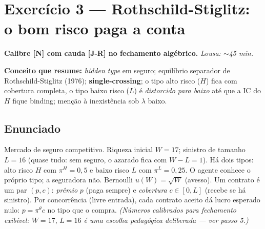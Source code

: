 \documentclass[11pt,a4paper]{article}
\newcommand{\calY}{\textbf{\textcolor{amarelo}{[N]}}} %
\newcommand{\calR}{\textbf{\textcolor{verm}{[J-R]}}}  %
\newcommand{\dc}[2]{#1{,}#2}
\newif\ifsolucao
\begin{document}
\hrulefill

\section*{\textcolor{insper}{Exercício 3 — Rothschild-Stiglitz: o bom risco paga a conta}}
\noindent\textbf{Calibre \calY{} com cauda \calR{} no fechamento algébrico.} \quad \emph{Lousa: $\sim$45 min.}
\par\smallskip
\noindent\textbf{Conceito que resume:} \emph{hidden type} em seguro; equilíbrio separador
de Rothschild-Stiglitz (1976); \textbf{single-crossing}; o tipo alto risco ($H$) fica com
cobertura completa, o tipo baixo risco ($L$) é \emph{distorcido para baixo} até que a IC do
$H$ fique binding; menção à inexistência sob $\lambda$ baixo.

\subsection*{Enunciado}
Mercado de seguro competitivo. Riqueza inicial $W = 17$; sinistro de tamanho $L = 16$
(quase tudo: sem seguro, o azarado fica com $W-L=1$). Há dois tipos: alto risco $H$ com
$\pi^H = \dc{0}{5}$ e baixo risco $L$ com $\pi^L = \dc{0}{25}$. O agente conhece o próprio
tipo; a seguradora não. Bernoulli $u(W)=\sqrt{W}$ (avesso). Um contrato é um par
$(p,c)$: \emph{prêmio} $p$ (paga sempre) e \emph{cobertura} $c\in[0,L]$ (recebe se há
sinistro). Por concorrência (livre entrada), cada contrato aceito dá lucro esperado nulo:
$p = \pi^\theta c$ no tipo que o compra.
\emph{(Números calibrados para fechamento exibível: $W=17,\,L=16$ é uma escolha
pedagógica deliberada — ver passo 5.)}

\ifsolucao
\end{document}
